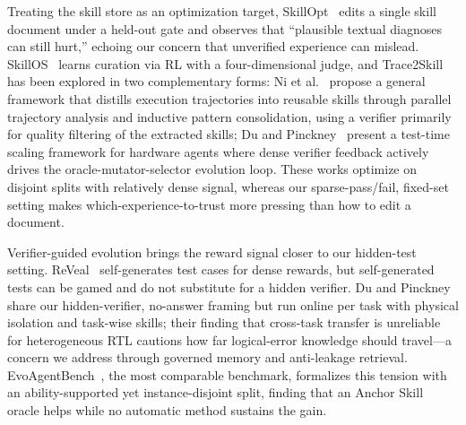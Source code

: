 Treating the skill store as an optimization target, SkillOpt~\cite{yang2026skillopt} edits a single skill document under a held-out gate and observes that ``plausible textual diagnoses can still hurt,'' echoing our concern that unverified experience can mislead. SkillOS~\cite{ouyang2026skillos} learns curation via RL with a four-dimensional judge, and Trace2Skill has been explored in two complementary forms: Ni et al.~\cite{ni2026trace2skill} propose a general framework that distills execution trajectories into reusable skills through parallel trajectory analysis and inductive pattern consolidation, using a verifier primarily for quality filtering of the extracted skills; Du and Pinckney~\cite{du2026trace2skill} present a test-time scaling framework for hardware agents where dense verifier feedback actively drives the oracle-mutator-selector evolution loop. These works optimize on disjoint splits with relatively dense signal, whereas our sparse-pass/fail, fixed-set setting makes which-experience-to-trust more pressing than how to edit a document.

Verifier-guided evolution brings the reward signal closer to our hidden-test setting. ReVeal~\cite{jin2025reveal} self-generates test cases for dense rewards, but self-generated tests can be gamed and do not substitute for a hidden verifier. Du and Pinckney~\cite{du2026trace2skill} share our hidden-verifier, no-answer framing but run online per task with physical isolation and task-wise skills; their finding that cross-task transfer is unreliable for heterogeneous RTL cautions how far logical-error knowledge should travel—a concern we address through governed memory and anti-leakage retrieval. EvoAgentBench~\cite{gao2026evoagentbench}, the most comparable benchmark, formalizes this tension with an ability-supported yet instance-disjoint split, finding that an Anchor Skill oracle helps while no automatic method sustains the gain.

